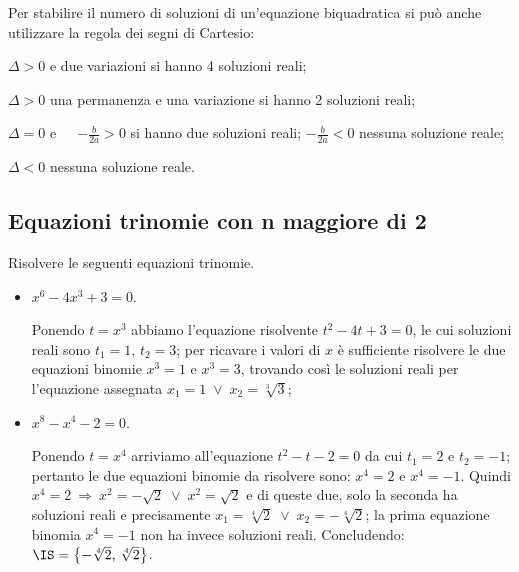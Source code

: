 Per stabilire il numero di soluzioni di un'equazione biquadratica si può anche utilizzare la regola dei segni di Cartesio:
\begin{itemize*}
\item $\Delta >0$ e due variazioni si hanno 4 soluzioni reali;
\item $\Delta >0$ una permanenza e una variazione si hanno 2 soluzioni reali;
\item $\Delta =0$ e~~~$-\frac b{2a}>0$ si hanno due soluzioni reali; $-\frac b{2a}<0$ nessuna soluzione reale;
\item $\Delta <0$ nessuna soluzione reale.
\end{itemize*}

\ovalbox{\risolvii \ref{ese:5.18}, \ref{ese:5.19}, \ref{ese:5.20}, \ref{ese:5.21}, \ref{ese:5.22}, \ref{ese:5.23}, \ref{ese:5.24}, \ref{ese:5.25}, \ref{ese:5.26}, \ref{ese:5.27}, \ref{ese:5.28}, \ref{ese:5.29}}

\subsection{Equazioni trinomie con n maggiore di 2}

\begin{exrig}
\begin{esempio}
Risolvere le seguenti equazioni trinomie.
\begin{itemize}
\item $ x^6-4x^3+3=0 $.

Ponendo $t=x^3$ abbiamo l'equazione risolvente $t^2-4t+3=0$, le cui soluzioni reali sono $t_1=1$, $t_2=3$; per ricavare i valori di $x$ è sufficiente risolvere le due equazioni binomie $x^3=1$ e $x^3=3$, trovando così le soluzioni reali per l'equazione assegnata $x_1=1\;\vee\; x_2=\sqrt[3]3$;

\item $ x^8-x^4-2=0 $.

Ponendo $t=x^4$ arriviamo all'equazione $t^2-t-2=0$ da cui $t_1=2$ e $t_2=-1$; pertanto le due equazioni binomie da risolvere sono: $x^4=2$ e $x^4=-1$. Quindi $x^4=2\:\Rightarrow\: x^2=-\sqrt 2\;\vee\; x^2=\sqrt 2$ e di queste due, solo la seconda ha soluzioni reali e precisamente $x_1=\sqrt[4]2 \;\vee\; x_2=-\sqrt[4]2$; la prima equazione binomia $x^4=-1$ non ha invece soluzioni reali. Concludendo: $\IS=\left\{-\sqrt[4]2\text{, }\sqrt[4]2\right\}$.
\end{itemize}
\end{esempio}
\end{exrig}

